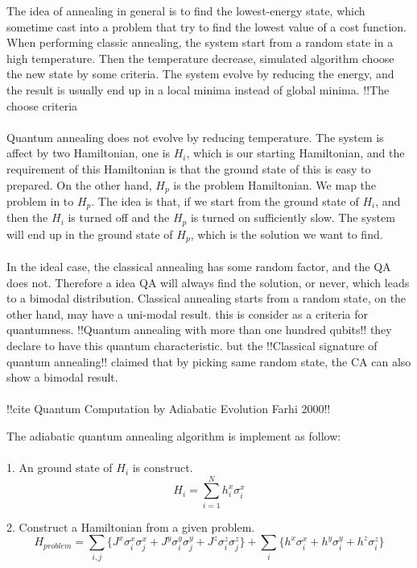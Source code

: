 \documentclass[twoside,a4paper,article]{combine}
\begin{document}
The idea of annealing in general is to find the lowest-energy state, which sometime cast into a problem that try to find the lowest value of a cost function. When performing classic annealing, the system start from a random state in a high temperature. Then the temperature decrease, simulated algorithm choose the new state by some criteria. The system evolve by reducing the energy, and the result is usually end up in a local minima instead of global minima. !!The choose criteria\\
\\
Quantum annealing does not evolve by reducing temperature. The system is affect by two Hamiltonian, one is $H_i$, which is our starting Hamiltonian, and the requirement of this Hamiltonian is that the ground state of this is easy to prepared. On the other hand, $H_p$ is the problem Hamiltonian. We map the problem in to $H_p$. The idea is that, if we start from the ground state of $H_i$, and then the $H_i$ is turned off and the $H_p$ is turned on sufficiently slow. The system will end up in the ground state of $H_p$, which is the solution we want to find.\\
\\
In the ideal case, the classical annealing has some random factor, and the QA does not. Therefore a idea QA will always find the solution, or never, which leads to a bimodal distribution. Classical annealing starts from a random state, on the other hand, may have a uni-modal result. this is consider as a criteria for quantumness. !!Quantum annealing with more than one hundred qubits!! they declare to have this quantum characteristic. but the !!Classical signature of quantum annealing!! claimed that by picking same random state, the CA can also show a bimodal result. \\
\\

!!cite Quantum Computation by Adiabatic Evolution Farhi 2000!!

The adiabatic quantum annealing algorithm is implement as follow:\\
\\
1. An ground state of $H_i$ is construct.
\begin{equation*}
	H_i=\sum_{i=1}^{N}h_i^x \sigma_i^x
\end{equation*}   

2. Construct a Hamiltonian from a given problem.
\begin{equation*}
	H_{problem}=\sum_{i,j} \{J^x \sigma^x_i \sigma^x_j+J^y \sigma^y_i \sigma^y_j+J^z \sigma^z_i \sigma^z_j \}+ \sum_{i} \{h^x \sigma^x_i+h^y \sigma^y_i+h^z \sigma^z_i\}
\end{equation*}   
\end{document}

